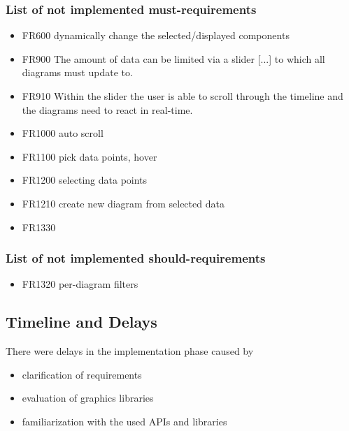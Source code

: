 \documentclass[oneside, english, final]{design}
\begin{document}
\subsubsection{List of not implemented must-requirements}
\begin{itemize}
      \item{FR600 dynamically change the selected/displayed components}
      \item{FR900 The amount of data can be limited via a slider [...]}
            to which all diagrams must update to.
      \item{FR910 Within the slider the user is able to scroll through the timeline and the diagrams need to react in real-time.}
      \item{FR1000 auto scroll}
      \item{FR1100 pick data points, hover}
      \item{FR1200 selecting data points}
      \item{FR1210 create new diagram from selected data}
      \item{FR1330}
\end{itemize}


\subsubsection{List of not implemented should-requirements}
\begin{itemize}
      \item{FR1320 per-diagram filters}
\end{itemize}


\subsection{Timeline and Delays}
There were delays in the implementation phase caused by
\begin{itemize}
      \item{clarification of requirements}
      \item{evaluation of graphics libraries}
      \item{familiarization with the used APIs and libraries}
\end{itemize}
\end{document}

